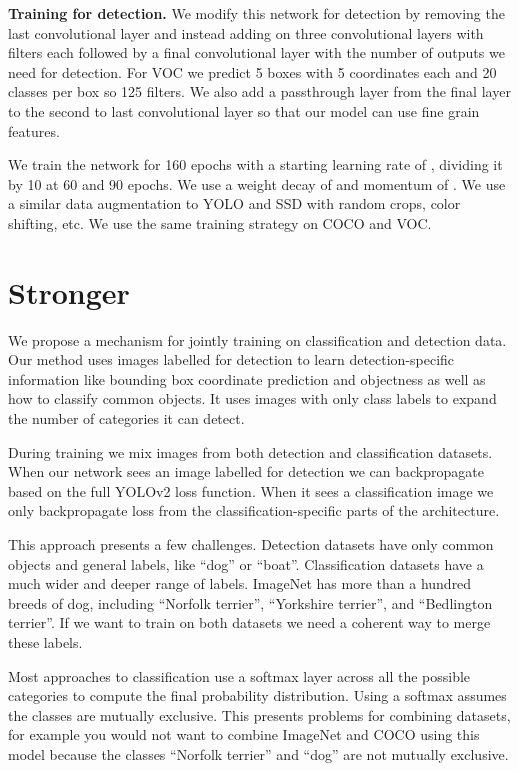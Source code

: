 \documentclass[10pt,twocolumn,letterpaper]{article}
\begin{document}
\textbf{Training for detection.} We modify this network for detection by removing the last convolutional layer and instead adding on three  convolutional layers with  filters each followed by a final  convolutional layer with the number of outputs we need for detection. For VOC we predict 5 boxes with 5 coordinates each and 20 classes per box so 125 filters. We also add a passthrough layer from the final  layer to the second to last convolutional layer so that our model can use fine grain features.

We train the network for 160 epochs with a starting learning rate of , dividing it by 10 at 60 and 90 epochs. We use a weight decay of  and momentum of . We use a similar data augmentation to YOLO and SSD with random crops, color shifting, etc. We use the same training strategy on COCO and VOC.

\section{Stronger}

We propose a mechanism for jointly training on classification and detection data. Our method uses images labelled for detection to learn detection-specific information like bounding box coordinate prediction and objectness as well as how to classify common objects. It uses images with only class labels to expand the number of categories it can detect.

During training we mix images from both detection and classification datasets. When our network sees an image labelled for detection we can backpropagate based on the full YOLOv2 loss function. When it sees a classification image we only backpropagate loss from the classification-specific parts of the architecture.

This approach presents a few challenges. Detection datasets have only common objects and general labels, like ``dog'' or ``boat''.  Classification datasets have a much wider and deeper range of labels. ImageNet has more than a hundred breeds of dog, including ``Norfolk terrier'', ``Yorkshire terrier'', and ``Bedlington terrier''. If we want to train on both datasets we need a coherent way to merge these labels.

Most approaches to classification use a softmax layer across all the possible categories to compute the final probability distribution. Using a softmax assumes the classes are mutually exclusive. This presents problems for combining datasets, for example you would not want to combine ImageNet and COCO using this model because the classes ``Norfolk terrier'' and ``dog'' are not mutually exclusive.
\end{document}

